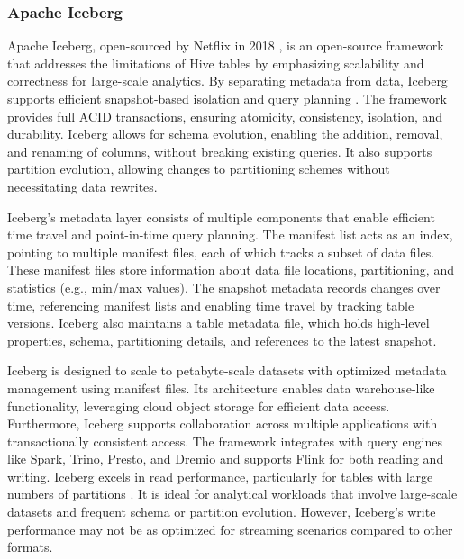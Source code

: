 \subsubsection*{Apache Iceberg}
Apache Iceberg, open-sourced by Netflix in 2018 \cite{IcebergExamples2024}, is an open-source framework that addresses the limitations of Hive tables by emphasizing scalability and correctness for large-scale analytics. By separating metadata from data, Iceberg supports efficient snapshot-based isolation and query planning \cite{shiranApacheIcebergDefinitive2024,iceberg_tech_docs}. The framework provides full \gls{ACID} transactions, ensuring atomicity, consistency, isolation, and durability. Iceberg allows for schema evolution, enabling the addition, removal, and renaming of columns, without breaking existing queries. It also supports partition evolution, allowing changes to partitioning schemes without necessitating data rewrites. 

Iceberg's metadata layer consists of multiple components that enable efficient time travel and point-in-time query planning. The manifest list acts as an index, pointing to multiple manifest files, each of which tracks a subset of data files. These manifest files store information about data file locations, partitioning, and statistics (e.g., min/max values). The snapshot metadata records changes over time, referencing manifest lists and enabling time travel by tracking table versions. Iceberg also maintains a table metadata file, which holds high-level properties, schema, partitioning details, and references to the latest snapshot. 

Iceberg is designed to scale to petabyte-scale datasets with optimized metadata management using manifest files. Its architecture enables data warehouse-like functionality, leveraging cloud object storage for efficient data access. Furthermore, Iceberg supports collaboration across multiple applications with transactionally consistent access. The framework integrates with query engines like Spark, Trino, Presto, and Dremio and supports Flink for both reading and writing. Iceberg excels in read performance, particularly for tables with large numbers of partitions \cite{comparison1_LakeFS}. It is ideal for analytical workloads that involve large-scale datasets and frequent schema or partition evolution. However, Iceberg's write performance may not be as optimized for streaming scenarios compared to other formats.

